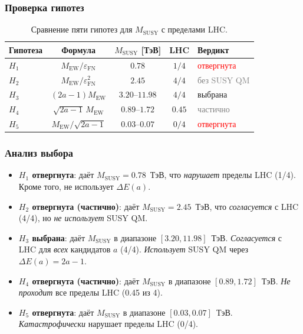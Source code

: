 \documentclass[11pt,a4paper]{article}
\theoremstyle{definition}
\begin{document}
\subsubsection{Проверка гипотез}

\begin{table}[ht]
\centering
\caption{Сравнение пяти гипотез для $M_{\text{SUSY}}$ с пределами LHC.}
\label{tab:hypotheses-main}
\begin{tabular}{lcccl}
\toprule
Гипотеза & Формула & $M_{\text{SUSY}}$ [ТэВ] & LHC & Вердикт \\
\midrule
$H_1$ & $M_{\text{EW}}/\varepsilon_{\text{FN}}$
      & $0.78$    & $1/4$ & \textcolor{red}{отвергнута} \\
$H_2$ & $M_{\text{EW}}/\varepsilon_{\text{FN}}^{2}$
      & $2.45$    & $4/4$ & \textcolor{gray}{без SUSY QM} \\
$H_3$ & $(2a - 1) M_{\text{EW}}$
      & $3.20$--$11.98$ & $4/4$ & \textcolor{green!60!black}{выбрана} \\
$H_4$ & $\sqrt{2a-1}\,M_{\text{EW}}$
      & $0.89$--$1.72$  & $0.45$ & \textcolor{gray}{частично} \\
$H_5$ & $M_{\text{EW}}/\sqrt{2a-1}$
      & $0.03$--$0.07$  & $0/4$ & \textcolor{red}{отвергнута} \\
\bottomrule
\end{tabular}
\end{table}

\subsubsection{Анализ выбора}

\begin{itemize}
    \item \textbf{$H_1$ отвергнута}: даёт $M_{\text{SUSY}} = 0.78$~ТэВ,
          что \emph{нарушает} пределы LHC (1/4). Кроме того,
          не использует $\Delta E(a)$.
    \item \textbf{$H_2$ отвергнута (частично)}: даёт
          $M_{\text{SUSY}} = 2.45$~ТэВ, что \emph{согласуется}
          с LHC (4/4), но \emph{не использует} SUSY QM.
    \item \textbf{$H_3$ выбрана}: даёт $M_{\text{SUSY}}$
          в диапазоне $[3.20, 11.98]$~ТэВ. \emph{Согласуется}
          с LHC для \emph{всех} кандидатов $a$ (4/4).
          \emph{Использует} SUSY QM через $\Delta E(a) = 2a - 1$.
    \item \textbf{$H_4$ отвергнута (частично)}: даёт
          $M_{\text{SUSY}}$ в диапазоне $[0.89, 1.72]$~ТэВ.
          \emph{Не проходит} все пределы LHC (0.45 из 4).
    \item \textbf{$H_5$ отвергнута}: даёт $M_{\text{SUSY}}$
          в диапазоне $[0.03, 0.07]$~ТэВ. \emph{Катастрофически}
          нарушает пределы LHC (0/4).
\end{itemize}
\end{document}
